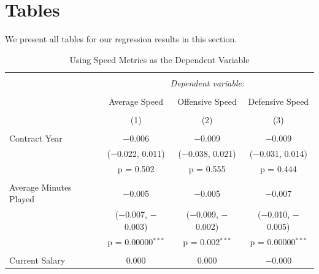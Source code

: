 \documentclass[12pt]{article}
\begin{document}
	\clearpage
	
	
	\clearpage
	
	\singlespacing
	
	
	
	
	
	\clearpage
	
	\onehalfspacing
	
	\appendix
	
	\section{Tables} \label{sec:tab}
	
	We present all tables for our regression results in this section.
	
	\begin{landscape}
		\begin{table}[!htbp] \centering 
			\caption{Using Speed Metrics as the Dependent Variable} 
			\label{} 
			\begin{tabular}{@{\extracolsep{5pt}}lccc} 
				\\[-1.8ex]\hline 
				\hline \\[-1.8ex] 
				& \multicolumn{3}{c}{\textit{Dependent variable:}} \\ 
				\cline{2-4} 
				\\[-1.8ex] & Average Speed & Offensive Speed & Defensive Speed \\ 
				\\[-1.8ex] & (1) & (2) & (3)\\ 
				\hline \\[-1.8ex] 
				Contract Year & $-$0.006 & $-$0.009 & $-$0.009 \\ 
				& ($-$0.022, 0.011) & ($-$0.038, 0.021) & ($-$0.031, 0.014) \\ 
				& p = 0.502 & p = 0.555 & p = 0.444 \\ 
				& & & \\ 
				Average Minutes Played & $-$0.005 & $-$0.005 & $-$0.007 \\ 
				& ($-$0.007, $-$0.003) & ($-$0.009, $-$0.002) & ($-$0.010, $-$0.005) \\ 
				& p = 0.00000$^{***}$ & p = 0.002$^{***}$ & p = 0.00000$^{***}$ \\ 
				& & & \\ 
				Current Salary & 0.000 & 0.000 & $-$0.000 \\ 

\end{tabular}
\end{table}
\end{landscape}
\end{document}
